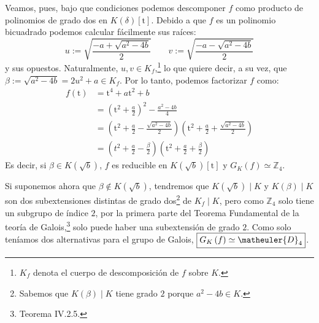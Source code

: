 \begin{sol}
    Veamos, pues, bajo que condiciones podemos descomponer $f$ como producto de polinomios de grado dos en $K\left( \delta \right)\left[ \mathrm{t} \right]$. Debido a que $f$ es un polinomio bicuadrado podemos calcular fácilmente sus raíces:
    \[
    u := \sqrt{\frac{-a + \sqrt{a^2 - 4b}}{2}}\qquad v := \sqrt{\frac{-a - \sqrt{a^2 - 4b}}{2}}
    \]
    y sus opuestos. Naturalmente, $u,v \in K_f$,\footnote{$K_f$ denota el cuerpo de descomposición de $f$ sobre $K$.} lo que quiere decir, a su vez, que $\beta := \sqrt{a^2 - 4b} = 2u^2 + a \in K_f$. Por lo tanto, podemos factorizar $f$ como:
    \begin{align*}
        f\left( \mathrm{t} \right) &= \mathrm{t}^4 + a \mathrm{t}^2 + b\\
        &= \left( \mathrm{t}^2 + \frac{a}{2} \right)^2 - \frac{a^2 - 4b}{4}\\
        &= \left( \mathrm{t}^2 + \frac{a}{2} - \frac{\sqrt{a^2 - 4b}}{2} \right) \left( \mathrm{t}^2 + \frac{a}{2} + \frac{\sqrt{a^2 - 4b}}{2} \right)\\
        &= \left( t^2 + \frac{a}{2} - \frac{\beta}{2} \right)\left( \mathrm{t}^2 + \frac{a}{2} + \frac{\beta}{2} \right)
    \end{align*}
    Es decir, si $\beta \in K\left( \sqrt{b} \right)$, $f$ es reducible en $K\left( \sqrt{b} \right)\left[ \mathrm{t} \right]$ y $\boxed{G_K\left( f \right) \simeq \mathbb{Z}_4}$.

    Si suponemos ahora que $\beta \not\in K\left( \sqrt{b} \right)$, tendremos que $K\left( \sqrt{b} \right) \mid K$ y $K\left( \beta \right) \mid K$ son dos subextensiones distintas de grado dos\footnote{Sabemos que $K\left( \beta \right) \mid K$ tiene grado $2$ porque $a^2 - 4b \in K$.} de $K_f \mid K$, pero como $\mathbb{Z}_4$ solo tiene un subgrupo de índice $2$, por la primera parte del Teorema Fundamental de la teoría de Galois,\footnote{Teorema IV.2.5\cite{cuerpos}.} solo puede haber una subextensión de grado $2$. Como solo teníamos dos alternativas para el grupo de Galois, $\boxed{G_K\left( f \right) \simeq \matheuler{D}_4}$.
\end{sol}
